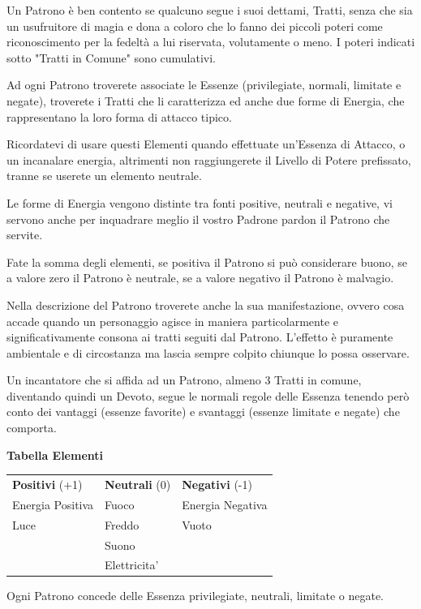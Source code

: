 \documentclass[a4paper,11pt,twoside,openany]{book}
\begin{document}
Un Patrono è ben contento se qualcuno segue i suoi dettami, Tratti, senza che sia un usufruitore di magia e dona a coloro che lo fanno dei piccoli poteri come riconoscimento per la fedeltà a lui riservata, volutamente o meno. I poteri indicati sotto "Tratti in Comune" sono cumulativi.

Ad ogni Patrono troverete associate le Essenze (privilegiate, normali, limitate e negate), troverete i Tratti che li caratterizza ed anche due forme di Energia, che rappresentano la loro forma di attacco tipico.

Ricordatevi di usare questi Elementi quando effettuate un'Essenza di Attacco, o un incanalare energia, altrimenti non raggiungerete il Livello di Potere prefissato, tranne se userete un elemento neutrale.

Le forme di Energia vengono distinte tra fonti positive, neutrali e negative, vi servono anche per inquadrare meglio il vostro Padrone pardon il Patrono che servite.

Fate la somma degli elementi, se positiva il Patrono si può considerare buono, se a valore zero il Patrono è neutrale, se a valore negativo il Patrono è malvagio.

Nella descrizione del Patrono troverete anche la sua manifestazione, ovvero cosa accade quando un personaggio agisce in maniera particolarmente e significativamente consona ai tratti seguiti dal Patrono. L'effetto è puramente ambientale e di circostanza ma lascia sempre colpito chiunque lo possa osservare.

Un incantatore che si affida ad un Patrono, almeno 3 Tratti in comune, diventando quindi un Devoto, segue le normali regole delle Essenza tenendo però conto dei vantaggi (essenze favorite) e svantaggi (essenze limitate e negate) che comporta.

\bigskip

\textbf{Tabella Elementi}
\medskip

\begin{tabular}{lll}
	\toprule
	\textbf{Positivi} (+1) & \textbf{Neutrali} (0) & \textbf{Negativi} (-1)\tabularnewline
	Energia Positiva       & Fuoco                 & Energia Negativa\tabularnewline
	Luce                   & Freddo                & Vuoto\tabularnewline
	                       & Suono                 & \tabularnewline
	                       & Elettricita'          & \tabularnewline
\end{tabular}
\bigskip

Ogni Patrono concede delle Essenza privilegiate, neutrali, limitate o negate.
\end{document}
